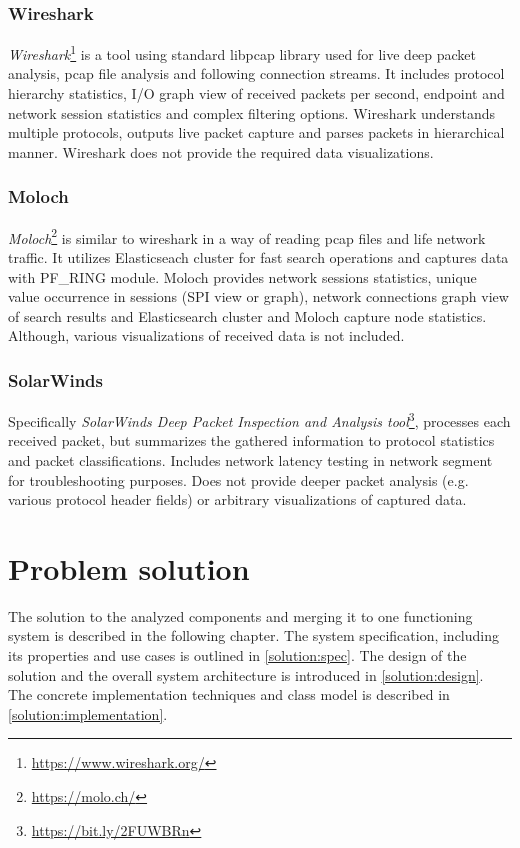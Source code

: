 \documentclass[12pt,a4paper,twoside]{report}
\begin{document}
		\subsection{Wireshark} \label{analysis:solutions:wireshark}
			\emph{Wireshark}\footnote{\url{https://www.wireshark.org/}} is a tool using standard libpcap library used for live deep packet analysis, pcap file analysis and following connection streams. It includes protocol hierarchy statistics, I/O graph view of received packets per second, endpoint and network session statistics and complex filtering options. Wireshark understands multiple protocols, outputs live packet capture and parses packets in hierarchical manner. Wireshark does not provide the required data visualizations.
		\subsection{Moloch} \label{analysis:solutions:moloch}
			\emph{Moloch}\footnote{\url{https://molo.ch/}} is similar to wireshark in a way of reading pcap files and life network traffic. It utilizes Elasticseach cluster for fast search operations and captures data with PF\_RING module. Moloch provides network sessions statistics, unique value occurrence in sessions (SPI view or graph), network connections graph view of search results and Elasticsearch cluster and Moloch capture node statistics. Although, various visualizations of received data is not included.
		\subsection{SolarWinds} \label{analysis:solutions:solarwinds}
			Specifically \emph{SolarWinds Deep Packet Inspection and Analysis tool}\footnote{\url{https://bit.ly/2FUWBRn}}, processes each received packet, but summarizes the gathered information to protocol statistics and packet classifications. Includes network latency testing in network segment for troubleshooting purposes. Does not provide deeper packet analysis (e.g. various protocol header fields) or arbitrary visualizations of captured data.\par
\chapter{Problem solution} \label{solution}
	The solution to the analyzed components and merging it to one functioning system is described in the following chapter. The system specification, including its properties and use cases is outlined in \autoref{solution:spec}. The design of the solution and the overall system architecture is introduced in \autoref{solution:design}. The concrete implementation techniques and class model is described in \autoref{solution:implementation}.
\end{document}

